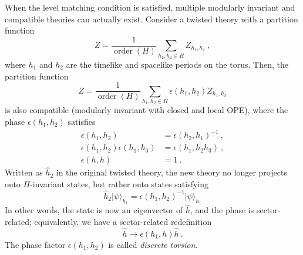 When the level matching condition is satisfied, multiple modularly invariant and compatible theories can actually exist. Consider a twisted theory with a partition function
\begin{equation}
	Z=\frac{1}{\operatorname{order}(H)}\sum_{h_{1},h_{2}\in H}Z_{h_{1},h_{2}} \:, \label{11.3.7}
\end{equation}
where $h_{1}$ and $h_{2}$ are the timelike and spacelike periods on the torus. Then, the partition function
\begin{equation}
	Z=\frac{1}{\operatorname{order}(H)}\sum_{h_{1},h_{2}\in H}\epsilon(h_{1},h_{2}) Z_{h_{1},h_{2}} \label{11.3.8}
\end{equation}
is also compatible (modularly invariant with closed and local OPE), where the phase $\epsilon(h_{1},h_{2})$ satisfies
\begin{subequations}
	\begin{align}
		\epsilon(h_{1},h_{2}) &= \epsilon(h_{2},h_{1})^{-1} \:, \label{11.3.9a} \\
		\epsilon(h_{1},h_{2})\epsilon(h_{1},h_{3}) &= \epsilon(h_{1},h_{2}h_{3}) \:,\label{11.3.9b} \\
		\epsilon(h,h) &= 1 \:. \label{11.3.9c}
	\end{align} \label{11.3.9}
\end{subequations}
Written as $\hat{h}_{2}$ in the original twisted theory, the new theory no longer projects onto $H$-invariant states, but rather onto states satisfying
\begin{equation}
	\hat{h}_{2}\lvert\psi\rangle_{h_{1}} = \epsilon(h_{1},h_{2})^{-1}\lvert \psi\rangle_{h_{1}} \label{11.3.10}    
\end{equation}
In other words, the state is now an eigenvector of $\hat{h}$, and the phase is sector-related; equivalently, we have a sector-related redefinition
\begin{equation}
	\hat{h}\to \epsilon(h_{1},h)\hat{h} \:. \label{11.3.11}
\end{equation}
The phase factor $\epsilon(h_{1},h_{2})$ is called \emph{discrete torsion}.

